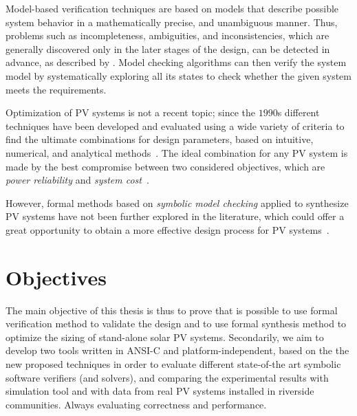 Model-based verification techniques are based on models that describe possible system behavior in a mathematically precise, and unambiguous manner. Thus, problems such as incompleteness, ambiguities, and inconsistencies, which are generally discovered only in the later stages of the design, can be detected in advance, as described by \cite{Trindade,TrindadeDJISC17}. 
Model checking algorithms can then verify the system model by systematically exploring all its states to check whether the given system meets the requirements.
%
%

Optimization of PV systems is not a recent topic; since the $1990$s different techniques have been developed and evaluated using a wide variety of criteria to find the ultimate combinations for design parameters, based on intuitive, numerical, and analytical methods~\cite{Applasamy2011}. The ideal combination for  any PV system is made by the best compromise between two considered objectives, which are \textit{power reliability} and \textit{system cost}~\cite{Alsadi2018}.
 
However, formal methods based on \textit{symbolic model checking} applied to synthesize PV systems have not been further explored in the literature, which could offer a great opportunity to obtain a more effective design process for PV systems~\cite{ClarkeHV18}.

\section{Objectives}

The main objective of this thesis is thus to prove that is possible to use formal verification method to validate the design and to use formal synthesis method to optimize the sizing of stand-alone solar PV systems. Secondarily, we aim to develop two tools written in ANSI-C and platform-independent, based on the the new proposed techniques in order to evaluate different state-of-the art symbolic software verifiers (and solvers), and comparing the experimental results with simulation tool and with data from real PV systems installed in riverside communities. Always evaluating correctness and performance.

